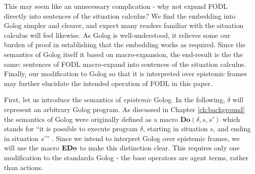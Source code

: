 This may seem like an unnecessary complication - why not expand FODL
directly into sentences of the situation calculus? We find the embedding
into Golog simpler and clearer, and expect many readers familiar with
the situation calculus will feel likewise. As Golog is well-understood,
it relieves some our burden of proof in establishing that the embedding
works as required. Since the semantics of Golog itself it based on
macro-expansion, the end-result is the the same: sentences of FODL
macro-expand into sentences of the situation calculus. Finally, our
modification to Golog so that it is interpreted over epistemic frames
may further elucidate the intended operation of FODL in this paper.

First, let us introduce the semantics of \emph{epistemic} Golog. In
the following, $\delta$ will represent an arbitrary Golog program.
As discussed in Chapter \ref{ch:background} the semantics of Golog
were originally defined as a macro $\mathbf{Do}(\delta,s,s')$ which
stands for {}``it is possible to execute program $\delta$, starting
in situation $s$, and ending in situation $s'$'' \citep{levesque97golog}.
Since we intend to interpret Golog over epistemic frames, we will
use the macro $\mathbf{EDo}$ to make this distinction clear. This requires
only one modification to the standarda Golog - the base operators
are agent terms, rather than actions.

